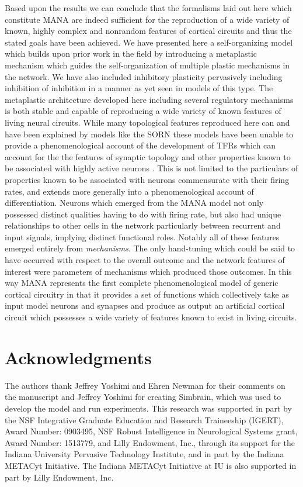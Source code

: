 \documentclass[10pt,letterpaper]{article}
\begin{document}
Based upon the results we can conclude that the formalisms laid out here which constitute MANA are indeed sufficient for the reproduction of a wide variety of known, highly complex  and nonrandom features of cortical circuits and thus the stated goals have been achieved. We have presented here a self-organizing model which builds upon prior work in the field by introducing a metaplastic mechanism which guides the self-organization of multiple plastic mechanisms in the network. We have also included inhibitory plasticity pervasively including inhibition of inhibition in a manner as yet seen in models of this type. The metaplastic architecture developed here including several regulatory mechanisms is both stable and capable of reproducing a wide variety of known features of living neural circuits.  While many topological features reproduced here can and have been explained by models like the SORN \cite{miner2016plasticity} these models have been unable to provide a phenomenological account of the development of TFRs which can account for the the features of synaptic topology and other properties known to be associated with highly active neurons \cite{benedetti2012differential}\cite{yassin2010embedded}. This is not limited to the particulars of properties known to be associated with neurons commensurate with their firing rates, and extends more generally into a phenomenological account of differentiation. Neurons which emerged from the MANA model not only possessed distinct qualities having to do with firing rate, but also had unique relationships to other cells in the network particularly between recurrent and input signals, implying distinct functional roles. Notably all of these features emerged entirely from \emph{mechanisms}. The only hand-tuning which could be said to have occurred with respect to the overall outcome and the network features of interest were parameters of mechanisms which produced those outcomes. In this way MANA represents the first complete phenomenological model of generic cortical circuitry in that it provides a set of functions which collectively take as input model neurons and synapses and produce as output an artificial cortical circuit which possesses a wide variety of features known to exist in living circuits. 



\section*{Acknowledgments}
The authors thank Jeffrey Yoshimi and Ehren Newman for their comments on the manuscript and Jeffrey Yoshimi for creating Simbrain, which was used to develop the model and run experiments. This research was supported in part by the NSF Integrative Graduate Education and Research Traineeship (IGERT), Award Number: 0903495, NSF Robust Intelligence in Neurological Systems grant, Award Number: 1513779, and Lilly Endowment, Inc., through its support for the Indiana University Pervasive Technology Institute, and in part by the Indiana METACyt Initiative. The Indiana METACyt Initiative at IU is also supported in part by Lilly Endowment, Inc. 
\end{document}
